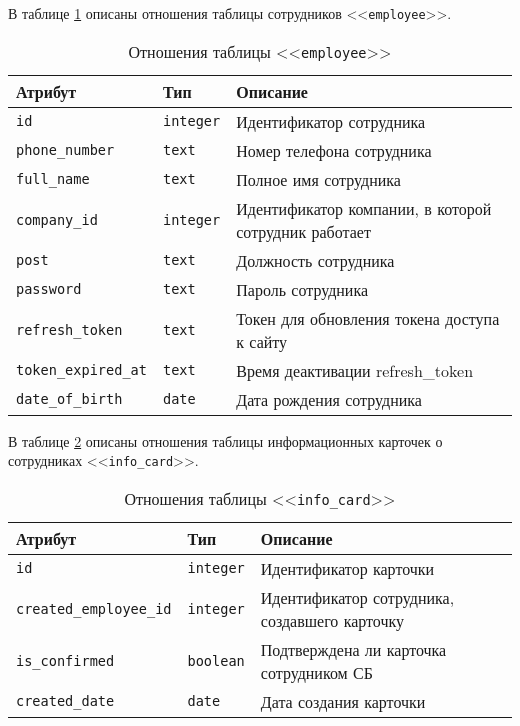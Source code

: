 В таблице \ref{table:employeeCols} описаны отношения таблицы сотрудников <<\texttt{employee}>>.
\begin{table}[h!]
	\begin{center}
	\caption{\label{table:employeeCols} Отношения таблицы <<\texttt{employee}>>}
		\begin{tabularx}{\textwidth}{|X|X|X|}
			\hline
			Атрибут & Тип & Описание \\ \hline
			\texttt{id} & \texttt{integer} & Идентификатор сотрудника \\ \hline
			\texttt{phone\_number} & \texttt{text} & Номер телефона сотрудника \\ \hline
			\texttt{full\_name} & \texttt{text} & Полное имя сотрудника \\ \hline
			\texttt{company\_id} & \texttt{integer} & Идентификатор компании, в которой сотрудник работает \\ \hline
			\texttt{post} & \texttt{text} & Должность сотрудника\\ \hline
			\texttt{password} & \texttt{text} & Пароль сотрудника \\ \hline
			\texttt{refresh\_token} & \texttt{text} & Токен для обновления токена доступа к сайту \\ \hline
			\texttt{token\_expired\_at} & \texttt{text} & Время деактивации refresh\_token \\ \hline
			\texttt{date\_of\_birth} & \texttt{date} & Дата рождения сотрудника \\ \hline
		\end{tabularx}
	\end{center}
\end{table}

\clearpage

В таблице \ref{table:infoCardCols} описаны отношения таблицы информационных карточек о сотрудниках <<\texttt{info\_card}>>.
\begin{table}[h!]
	\begin{center}
	\caption{\label{table:infoCardCols} Отношения таблицы <<\texttt{info\_card}>>}
		\begin{tabularx}{\textwidth}{|X|X|X|}
			\hline
			Атрибут & Тип & Описание \\ \hline
			\texttt{id} & \texttt{integer} & Идентификатор карточки \\ \hline
			\texttt{created\_employee\_id} & \texttt{integer} & Идентификатор сотрудника, создавшего карточку \\ \hline
			\texttt{is\_confirmed} & \texttt{boolean} & Подтверждена ли карточка сотрудником СБ \\ \hline
			\texttt{created\_date} & \texttt{date} & Дата создания карточки \\ \hline
		\end{tabularx}
	\end{center}
\end{table}

